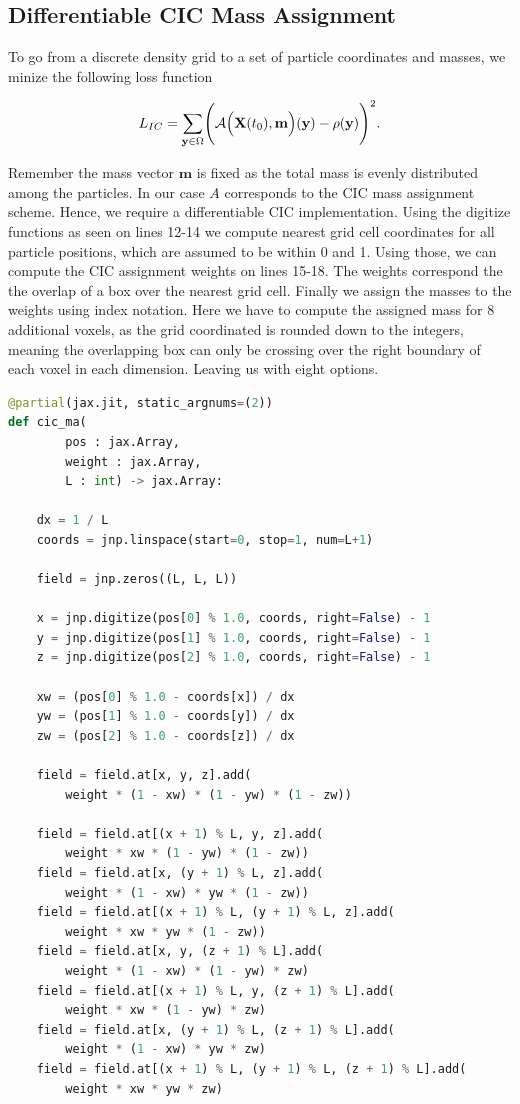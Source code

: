 \documentclass{article}
\begin{document}
{\begin{appendices}
\newpage
\section{Differentiable CIC Mass Assignment}
\label{inverse-map}

To go from a discrete density grid to a set of particle coordinates and masses, we minize the following loss function

\begin{equation}
    L_{IC} = \sum_{\mathbf{y} \in \Omega} \Biggl(\mathcal{A}\Bigl(\mathbf{X}(t_0), \mathbf{m}\Bigr)(\mathbf{y}) - \rho(\mathbf{y})\Biggr)^2.
\end{equation}

Remember the mass vector $\mathbf{m}$ is fixed as the total mass is evenly distributed among the particles. In our case $A$ corresponds to the CIC mass assignment scheme. Hence, we require a differentiable CIC implementation. Using the digitize functions as seen on lines 12-14 we compute nearest grid cell coordinates for all particle positions, which are assumed to be within 0 and 1. Using those, we can compute the CIC assignment weights on lines 15-18. The weights correspond the the overlap of a box over the nearest grid cell. Finally we assign the masses to the weights using index notation. Here we have to compute the assigned mass for 8 additional voxels, as the grid coordinated is rounded down to the integers, meaning the overlapping box can only be crossing over the right boundary of each voxel in each dimension. Leaving us with eight options.

\begin{lstlisting}[language=Python]
@partial(jax.jit, static_argnums=(2))
def cic_ma(
        pos : jax.Array, 
        weight : jax.Array, 
        L : int) -> jax.Array:
        
    dx = 1 / L
    coords = jnp.linspace(start=0, stop=1, num=L+1)

    field = jnp.zeros((L, L, L))

    x = jnp.digitize(pos[0] % 1.0, coords, right=False) - 1
    y = jnp.digitize(pos[1] % 1.0, coords, right=False) - 1
    z = jnp.digitize(pos[2] % 1.0, coords, right=False) - 1

    xw = (pos[0] % 1.0 - coords[x]) / dx
    yw = (pos[1] % 1.0 - coords[y]) / dx
    zw = (pos[2] % 1.0 - coords[z]) / dx

    field = field.at[x, y, z].add(
        weight * (1 - xw) * (1 - yw) * (1 - zw))
        
    field = field.at[(x + 1) % L, y, z].add(
        weight * xw * (1 - yw) * (1 - zw))
    field = field.at[x, (y + 1) % L, z].add(
        weight * (1 - xw) * yw * (1 - zw))
    field = field.at[(x + 1) % L, (y + 1) % L, z].add(
        weight * xw * yw * (1 - zw))
    field = field.at[x, y, (z + 1) % L].add(
        weight * (1 - xw) * (1 - yw) * zw)
    field = field.at[(x + 1) % L, y, (z + 1) % L].add(
        weight * xw * (1 - yw) * zw)
    field = field.at[x, (y + 1) % L, (z + 1) % L].add(
        weight * (1 - xw) * yw * zw)
    field = field.at[(x + 1) % L, (y + 1) % L, (z + 1) % L].add(
        weight * xw * yw * zw)


\end{lstlisting}
\end{appendices}}
\end{document}
